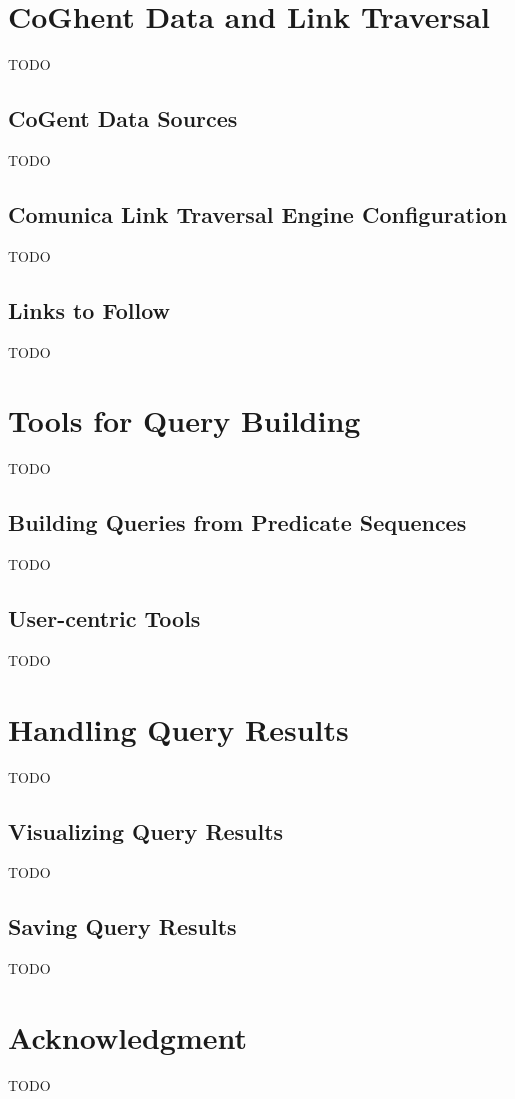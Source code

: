 \documentclass[conference]{IEEEtran}
\begin{document}
\section{CoGhent Data and Link Traversal}
TODO

\subsection{CoGent Data Sources}
TODO

\subsection{Comunica Link Traversal Engine Configuration}
TODO

\subsection{Links to Follow}
TODO

\section{Tools for Query Building}
TODO

\subsection{Building Queries from Predicate Sequences}
TODO

\subsection{User-centric Tools}
TODO

\section{Handling Query Results}
TODO

\subsection{Visualizing Query Results}
TODO

\subsection{Saving Query Results}
TODO

\section*{Acknowledgment}
TODO

% 
% 
\end{document}
